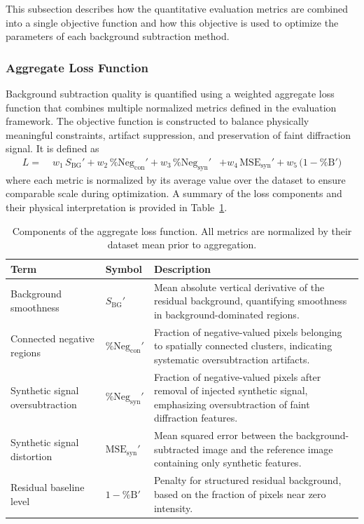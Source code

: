 \documentclass[iucr,review]{iucrjournals}
\begin{document}
This subsection describes how the quantitative evaluation metrics are combined into a single objective function and how this objective is used to optimize the parameters of each background subtraction method.



\subsubsection{Aggregate Loss Function}

Background subtraction quality is quantified using a weighted aggregate loss function that combines multiple normalized metrics defined in the evaluation framework. The objective function is constructed to balance physically meaningful constraints, artifact suppression, and preservation of faint diffraction signal. It is defined as
\begin{equation}
\begin{aligned}
L =\;&
w_1\, S_{\mathrm{BG}}'
+ w_2\, \%\mathrm{Neg}_{\mathrm{con}}'
+ w_3\, \%\mathrm{Neg}_{\mathrm{syn}}'
&+ w_4\, \mathrm{MSE}_{\mathrm{syn}}'
+ w_5\, \bigl(1 - \%\mathrm{B}'\bigr)
\end{aligned}
\end{equation}
where each metric is normalized by its average value over the dataset to ensure comparable scale during optimization. A summary of the loss components and their physical interpretation is provided in Table~\ref{tab:loss_terms}.

\begin{table}[t]
\caption{Components of the aggregate loss function. All metrics are normalized
by their dataset mean prior to aggregation.}
\label{tab:loss_terms}
\centering
\small
\setlength{\tabcolsep}{6pt}
\renewcommand{\arraystretch}{1.1}
\begin{tabular}{@{}llp{7cm}@{}}
\toprule
\textbf{Term} & \textbf{Symbol} & \textbf{Description} \\
\midrule
Background smoothness & $S_{\mathrm{BG}}'$ & Mean absolute vertical derivative of the residual background, quantifying smoothness in background-dominated regions. \\
Connected negative regions & $\%\mathrm{Neg}_{\mathrm{con}}'$ & Fraction of negative-valued pixels belonging to spatially connected clusters, indicating systematic oversubtraction artifacts. \\
Synthetic signal oversubtraction & $\%\mathrm{Neg}_{\mathrm{syn}}'$ & Fraction of negative-valued pixels after removal of injected synthetic signal, emphasizing oversubtraction of faint diffraction features. \\
Synthetic signal distortion & $\mathrm{MSE}_{\mathrm{syn}}'$ & Mean squared error between the background-subtracted image and the reference image containing only synthetic features. \\
Residual baseline level & $1 - \%\mathrm{B}'$ & Penalty for structured residual background, based on the fraction of pixels near zero intensity. \\
\bottomrule
\end{tabular}
\end{table}
\end{document}
